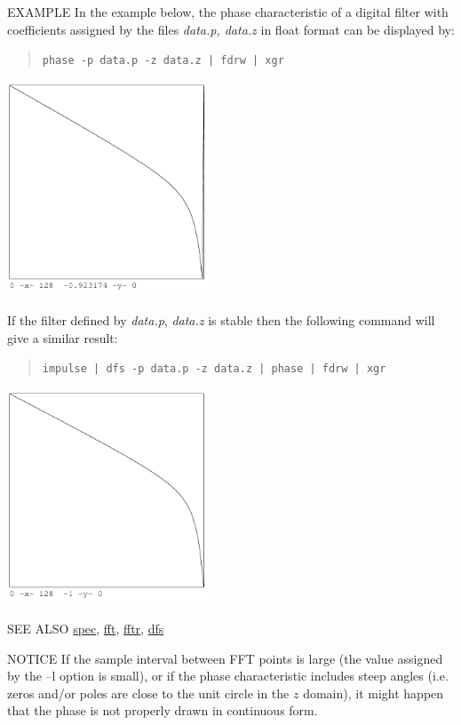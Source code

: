 \begin{qsection}{EXAMPLE}
In the example below, the phase characteristic of a digital filter
with coefficients assigned by the files {\em data.p, data.z} 
in float format can be displayed by:
\begin{quote}
  \verb!phase -p data.p -z data.z | fdrw | xgr !
\end{quote}
\begin{center}
\includegraphics[width=6cm]{fig/phase_1.pdf}
\end{center}
If the filter defined by {\em data.p}, {\em data.z} is stable
then the following command will give a similar result:
\begin{quote}
  \verb!impulse | dfs -p data.p -z data.z | phase | fdrw | xgr !
\end{quote}
\begin{center}
\includegraphics[width=6cm]{fig/phase_2.pdf}
\end{center}
\end{qsection}

\begin{qsection}{SEE ALSO}
\hyperlink{spec}{spec},
\hyperlink{fft}{fft},
\hyperlink{fftr}{fftr},
\hyperlink{dfs}{dfs}
\end{qsection}

\begin{qsection}{NOTICE}
If the sample interval between FFT points is large
(the value assigned by the --l option is small),
or if the phase characteristic includes steep angles
(i.e. zeros and/or poles are close to the unit circle in the $z$
 domain), it might happen that the phase is not properly drawn in continuous form.
\end{qsection}
